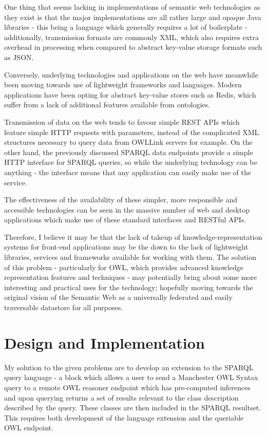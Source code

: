 \documentclass{article}
\begin{document}

One thing that seems lacking in implementations of semantic web technologies as
they exist is that the major implementations are all rather large and opaque
Java libraries - this being a language which generally requires a lot of
boilerplate - additionally, transmission formats are commonly XML, which also
requires extra overhead in processing when compared to abstract key-value
storage formats such as JSON. 

Conversely, underlying technologies and applications on the web have meanwhile 
been moving towards use of lightweight frameworks and languages. Modern applications 
have been opting for abstract key-value stores such as Redis, which suffer from
a lack of additional features available from ontologies. 

Transmission of data on the web tends to favour simple REST APIs which feature 
simple HTTP requests with parameters\cite{rest}, instead of the complicated XML structures 
necessary to query data from OWLLink servers for example. On the other hand, the
previously discussed SPARQL data endpoints provide a simple HTTP interface for
SPARQL queries, so while the underlying technology can be anything - the
interface means that any application can easily make use of the service.

The effectiveness of the availability of these simpler, more responsible and 
accessible 
technologies\cite{uptake} can be seen in the massive number of web and desktop applications
which make use of these standard interfaces and RESTful APIs. 

Therefore, I believe it may be that the lack of takeup of knowledge-representation systems
for front-end applications may be the down to the lack of lightweight libraries, 
services and frameworks available for working with them. The solution of this
problem - particularly for OWL, which provides advanced knowledge representation
features and techniques - may potentially bring about some more interesting and
practical uses for the technology; hopefully moving towards the original vision
of the Semantic Web as a universally federated and easily traversable datastore
for all purposes.

\section{Design and Implementation}

My solution to the given problems are to develop an extension to the SPARQL
query language - a block which allows a user to send a Manchester OWL Syntax query to a
remote OWL reasoner endpoint which has pre-computed inferences and upon querying
returns a set of results relevant to the class description described by the
query. These classes are then included in the SPARQL resultset. This requires 
both development of the language extension and the queriable OWL endpoint.
\end{document}
